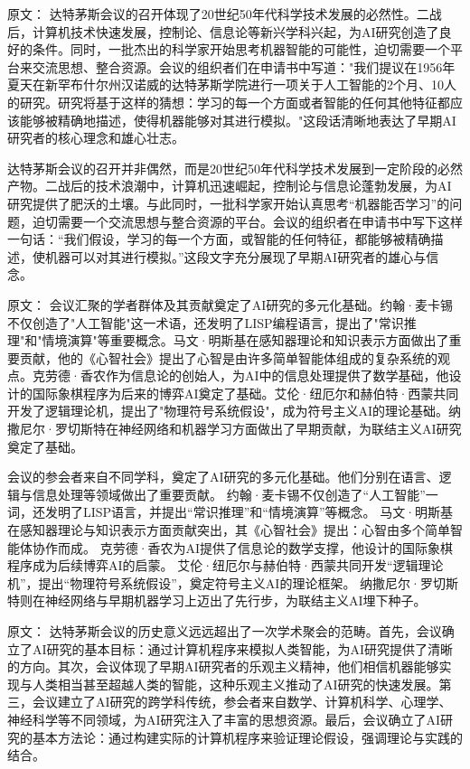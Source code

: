 原文：
达特茅斯会议的召开体现了20世纪50年代科学技术发展的必然性。二战后，计算机技术快速发展，控制论、信息论等新兴学科兴起，为AI研究创造了良好的条件。同时，一批杰出的科学家开始思考机器智能的可能性，迫切需要一个平台来交流思想、整合资源。会议的组织者们在申请书中写道："我们提议在1956年夏天在新罕布什尔州汉诺威的达特茅斯学院进行一项关于人工智能的2个月、10人的研究。研究将基于这样的猜想：学习的每一个方面或者智能的任何其他特征都应该能够被精确地描述，使得机器能够对其进行模拟。"这段话清晰地表达了早期AI研究者的核心理念和雄心壮志。

达特茅斯会议的召开并非偶然，而是20世纪50年代科学技术发展到一定阶段的必然产物。二战后的技术浪潮中，计算机迅速崛起，控制论与信息论蓬勃发展，为AI研究提供了肥沃的土壤。与此同时，一批科学家开始认真思考“机器能否学习”的问题，迫切需要一个交流思想与整合资源的平台。会议的组织者在申请书中写下这样一句话：“我们假设，学习的每一个方面，或智能的任何特征，都能够被精确描述，使机器可以对其进行模拟。”这段文字充分展现了早期AI研究者的雄心与信念。

原文：
会议汇聚的学者群体及其贡献奠定了AI研究的多元化基础。约翰·麦卡锡不仅创造了"人工智能"这一术语，还发明了LISP编程语言，提出了"常识推理"和"情境演算"等重要概念。马文·明斯基在感知器理论和知识表示方面做出了重要贡献，他的《心智社会》提出了心智是由许多简单智能体组成的复杂系统的观点。克劳德·香农作为信息论的创始人，为AI中的信息处理提供了数学基础，他设计的国际象棋程序为后来的博弈AI奠定了基础。艾伦·纽厄尔和赫伯特·西蒙共同开发了逻辑理论机，提出了"物理符号系统假设"，成为符号主义AI的理论基础。纳撒尼尔·罗切斯特在神经网络和机器学习方面做出了早期贡献，为联结主义AI研究奠定了基础。

会议的参会者来自不同学科，奠定了AI研究的多元化基础。他们分别在语言、逻辑与信息处理等领域做出了重要贡献。  
约翰·麦卡锡不仅创造了“人工智能”一词，还发明了LISP语言，并提出“常识推理”和“情境演算”等概念。  
马文·明斯基在感知器理论与知识表示方面贡献突出，其《心智社会》提出：心智由多个简单智能体协作而成。  
克劳德·香农为AI提供了信息论的数学支撑，他设计的国际象棋程序成为后续博弈AI的启蒙。  
艾伦·纽厄尔与赫伯特·西蒙共同开发“逻辑理论机”，提出“物理符号系统假设”，奠定符号主义AI的理论框架。  
纳撒尼尔·罗切斯特则在神经网络与早期机器学习上迈出了先行步，为联结主义AI埋下种子。

原文：
达特茅斯会议的历史意义远远超出了一次学术聚会的范畴。首先，会议确立了AI研究的基本目标：通过计算机程序来模拟人类智能，为AI研究提供了清晰的方向。其次，会议体现了早期AI研究者的乐观主义精神，他们相信机器能够实现与人类相当甚至超越人类的智能，这种乐观主义推动了AI研究的快速发展。第三，会议建立了AI研究的跨学科传统，参会者来自数学、计算机科学、心理学、神经科学等不同领域，为AI研究注入了丰富的思想资源。最后，会议确立了AI研究的基本方法论：通过构建实际的计算机程序来验证理论假设，强调理论与实践的结合。

